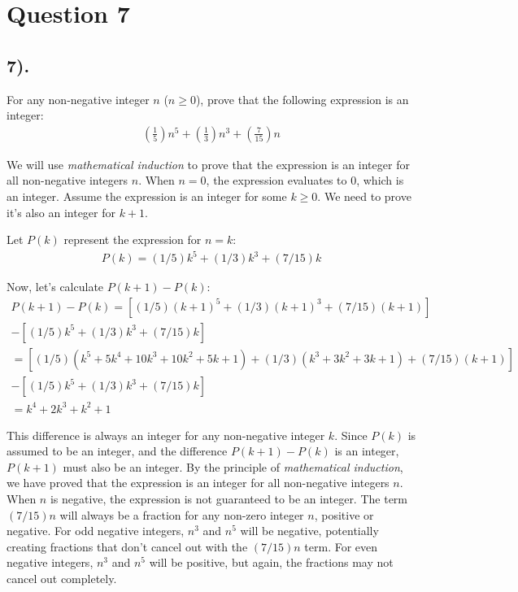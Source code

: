 \documentclass[12pt]{article}
\begin{document}
\section*{Question 7}
\subsection*{7).}
For any non-negative integer $n$ ($n \geq 0$), prove that the following expression is an integer:
\begin{gather*}
    (\frac{1}{5})n^5 + (\frac{1}{3})n^3 + (\frac{7}{15})n
\end{gather*}

We will use \textit{mathematical induction} to prove that the expression is an integer for all non-negative integers $n$.
When $n = 0$, the expression evaluates to 0, which is an integer.
Assume the expression is an integer for some $k \geq 0$. We need to prove it's also an integer for $k + 1$.

Let $P(k)$ represent the expression for $n = k$:
\begin{gather*}
    P(k) = (1/5)k^5 + (1/3)k^3 + (7/15)k
\end{gather*}

Now, let's calculate $P(k+1) - P(k)$:
\begin{gather*}
    P(k+1) - P(k) = [(1/5){(k+1)}^5 + (1/3){(k+1)}^3 + (7/15)(k+1)] \\
    - [(1/5)k^5 + (1/3)k^3 + (7/15)k] \\
    = [(1/5)(k^5 + 5k^4 + 10k^3 + 10k^2 + 5k + 1) + (1/3)(k^3 + 3k^2 + 3k + 1) + (7/15)(k+1)] \\
    - [(1/5)k^5 + (1/3)k^3 + (7/15)k] \\
    = k^4 + 2k^3 + k^2 + 1
\end{gather*}

This difference is always an integer for any non-negative integer $k$. Since $P(k)$ is assumed to be an integer, and the difference $P(k+1) - P(k)$ is an integer, $P(k+1)$ must also be an integer.
By the principle of \textit{mathematical induction}, we have proved that the expression is an integer for all non-negative integers $n$. \\

When $n$ is negative, the expression is not guaranteed to be an integer.
The term $(7/15)n$ will always be a fraction for any non-zero integer $n$, positive or negative.
For odd negative integers, $n^3$ and $n^5$ will be negative, potentially creating fractions that don't cancel out with the $(7/15)n$ term.
For even negative integers, $n^3$ and $n^5$ will be positive, but again, the fractions may not cancel out completely.
\end{document}
